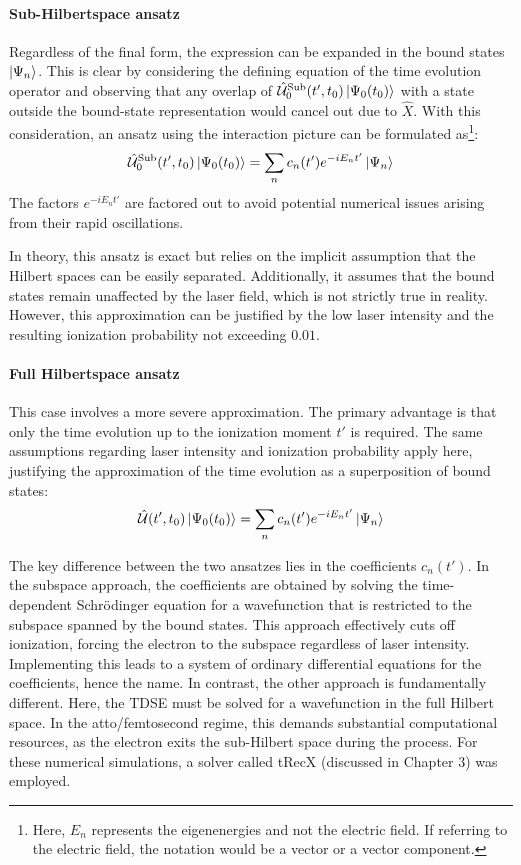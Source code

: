 \paragraph{Sub-Hilbertspace ansatz}
Regardless of the final form, the expression can be expanded in the bound states $\ket{\Psi_n}$.
This is clear by considering the defining equation of the time evolution operator and observing that any overlap of $\hat{\mathcal{U}}^{\mathrm{Sub}}_0(t',t_0)\ket{\Psi_0(t_0)}$ with a state outside the bound-state representation would cancel out due to $\hat{X}$.
With this consideration, an ansatz using the interaction picture can be formulated as\footnote{Here, $E_n$ represents the eigenenergies and not the electric field. If referring to the electric field, the notation would be a vector or a vector component.}:
\begin{equation*}
    \hat{\mathcal{U}}^{\mathrm{Sub}}_0(t',t_0)\ket{\Psi_0(t_0)} = \sum_{n}c_n(t')e^{-iE_nt'}\ket{\Psi_n}
\end{equation*}
The factors $e^{-iE_nt'}$ are factored out to avoid potential numerical issues arising from their rapid oscillations.

In theory, this ansatz is exact but relies on the implicit assumption that the Hilbert spaces can be easily separated.
Additionally, it assumes that the bound states remain unaffected by the laser field, which is not strictly true in reality.
However, this approximation can be justified by the low laser intensity and the resulting ionization probability not exceeding $0.01$.

\paragraph{Full Hilbertspace ansatz}
This case involves a more severe approximation.
The primary advantage is that only the time evolution up to the ionization moment $t'$ is required.
The same assumptions regarding laser intensity and ionization probability apply here, justifying the approximation of the time evolution as a superposition of bound states:
\begin{equation*}
    \hat{\mathcal{U}}(t',t_0)\ket{\Psi_0(t_0)} = \sum_{n}c_n(t')e^{-iE_nt'}\ket{\Psi_n}
\end{equation*}

\bigskip

The key difference between the two ansatzes lies in the coefficients $c_n(t')$.
In the subspace approach, the coefficients are obtained by solving the time-dependent Schrödinger equation for a wavefunction that is restricted to the subspace spanned by the bound states.
This approach effectively cuts off ionization, forcing the electron to the subspace regardless of laser intensity.
Implementing this leads to a system of ordinary differential equations for the coefficients, hence the name.
In contrast, the other approach is fundamentally different.
Here, the TDSE must be solved for a wavefunction in the full Hilbert space.
In the atto/femtosecond regime, this demands substantial computational resources, as the electron exits the sub-Hilbert space during the process.
For these numerical simulations, a solver called tRecX (discussed in Chapter 3) was employed.

